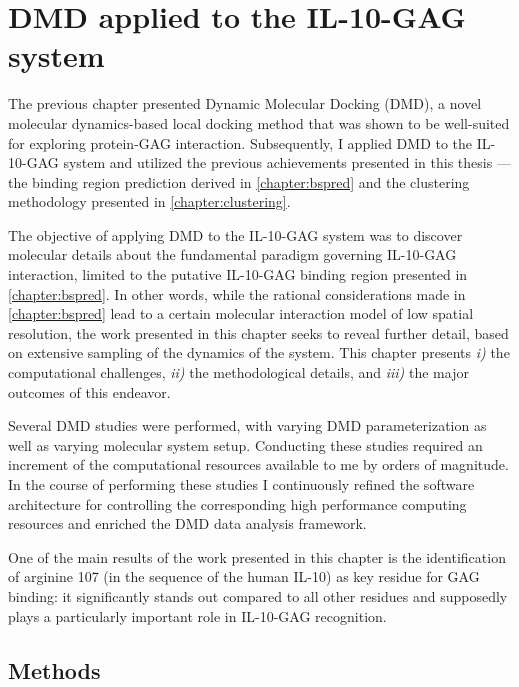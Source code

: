\chapter{DMD applied to the IL-10-GAG system}
\label{chapter:dmdil10}

The previous chapter presented Dynamic Molecular Docking (DMD), a novel
molecular dynamics-based local docking method that was shown to be well-suited
for exploring protein-GAG interaction. Subsequently, I applied DMD to the
IL-10-GAG system and utilized the previous achievements presented in this thesis
--- the binding region prediction derived in \cref{chapter:bspred} and the
clustering methodology presented in \cref{chapter:clustering}.

The objective of applying DMD to the IL-10-GAG system was to discover molecular
details about the fundamental paradigm governing IL-10-GAG interaction, limited
to the putative IL-10-GAG binding region presented in \cref{chapter:bspred}. In
other words, while the rational considerations made in \cref{chapter:bspred}
lead to a certain molecular interaction model of low spatial resolution, the
work presented in this chapter seeks to reveal further detail, based on
extensive sampling of the dynamics of the system. This chapter presents
\textit{i)} the computational challenges, \textit{ii)} the methodological
details, and \textit{iii)} the major outcomes of this endeavor.

Several DMD studies were performed, with varying DMD parameterization as well as
varying molecular system setup. Conducting these studies required an increment
of the computational resources available to me by orders of magnitude. In the
course of performing these studies I continuously refined the software
architecture for controlling the corresponding high performance computing
resources and enriched the DMD data analysis framework.

One of the main results of the work presented in this chapter is the
identification of arginine 107 (in the sequence of the human IL-10) as key
residue for GAG binding: it significantly stands out compared to all other
residues and supposedly plays a particularly important role in IL-10-GAG
recognition.



\section{Methods}

